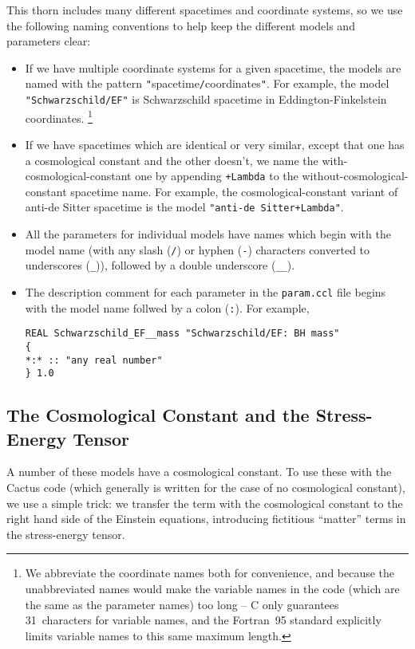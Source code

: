 This thorn includes many different spacetimes and coordinate systems,
so we use the following naming conventions to help keep the different
models and parameters clear:
\begin{itemize}
\item	If we have multiple coordinate systems for a given spacetime,
	the models are named with the pattern
	\hbox{{\tt "}spacetime{\tt /}coordinates{\tt "}}.
	For example, the model \verb|"Schwarzschild/EF"| is Schwarzschild
	spacetime in Eddington-Finkelstein coordinates.%
\footnote{%
	 We abbreviate the coordinate names both for
	 convenience, and because the unabbreviated
	 names would make the variable names in the
	 code (which are the same as the parameter names)
	 too long -- C only guarantees 31~characters for
	 variable names, and the Fortran~95 standard
	 explicitly limits variable names to this same
	 maximum length.
	 }%
\item	If we have spacetimes which are identical or very similar,
	except that one has a cosmological constant and the other
	doesn't, we name the with-cosmological-constant one by appending
	\verb|+Lambda| to the without-cosmological-constant spacetime
	name.  For example, the cosmological-constant variant of
	anti-de Sitter spacetime is the model \verb|"anti-de Sitter+Lambda"|.
\item	All the parameters for individual models have names which begin
	with the model name (with any slash (\verb|/|) or hyphen (\verb|-|)
	characters converted to underscores (\verb|_|)), followed by
	a double underscore (\verb|__|).
\item	The description comment for each parameter in the \verb|param.ccl|
	file begins with the model name follwed by a colon (\verb|:|).
	For example,
\begin{verbatim}
REAL Schwarzschild_EF__mass "Schwarzschild/EF: BH mass"
{
*:* :: "any real number"
} 1.0
\end{verbatim}
\end{itemize}


\subsection{The Cosmological Constant and the Stress-Energy Tensor}
\label{AEIThorns/Exact/cosmological-constant+stress-energy-tensor}

A number of these models have a cosmological constant.  To use these
with the Cactus code (which generally is written for the case of no
cosmological constant), we use a simple trick: we transfer the term
with the cosmological constant to the right hand side of the Einstein
equations, introducing fictitious ``matter'' terms in the stress-energy 
tensor.

